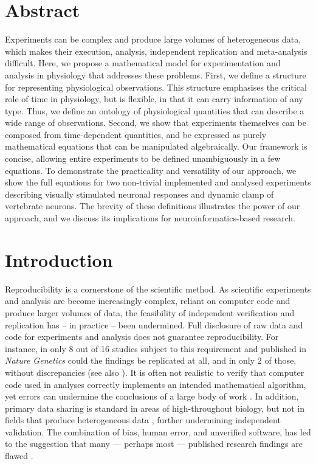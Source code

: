 
\section*{Abstract}

Experiments can be complex and produce large volumes of heterogeneous
data, which makes their execution, analysis, independent replication
and meta-analysis difficult. Here, we propose a mathematical model for
experimentation and analysis in physiology that addresses these
problems. First, we define a structure for representing physiological
observations. This structure emphasises the critical role of time in
physiology, but is flexible, in that it can carry information of any
type. Thus, we define an ontology of physiological quantities that can
describe a wide range of observations. Second, we show that
experiments themselves can be composed from time-dependent quantities,
and be expressed as purely mathematical equations that can be
manipulated algebraically. Our framework is concise, allowing entire
experiments to be defined unambiguously in a few equations. To
demonstrate the practicality and versatility of our approach, we show
the full equations for two non-trivial implemented and analysed
experiments describing visually stimulated neuronal responses and
dynamic clamp of vertebrate neurons. The brevity of these definitions
illustrates the power of our approach, and we discuss its implications
for neuroinformatics-based research.

\pagebreak

\section*{Introduction}

Reproducibility is a cornerstone of the scientific method. As
scientific experiments and analysis are become increasingly complex,
reliant on computer code and produce larger volumes of data, the
feasibility of independent verification and replication has -- in
practice -- been undermined. Full disclosure of raw data and code for
experiments and analysis does not guarantee reproducibility.  For
instance, in only 8 out of 16 studies subject to this requirement and
published in \emph{Nature Genetics} could the findings be replicated
at all, and in only 2 of those, without discrepancies
\cite{Ioannidis2008} (see also \cite{Baggerly2009,
  McCullough2007}). It is often not realistic to verify that computer
code used in analyses correctly implements an intended mathematical
algorithm, yet errors can undermine the conclusions of a
large body of work \cite{Chang2006}.  In addition, primary data
sharing is standard in areas of high-throughout biology, but
not in fields that produce heterogeneous data \cite{Gardner2005},
further undermining independent validation.  The combination
of bias, human error, and unverified software, has led to the
suggestion that many --- perhaps most --- published research findings
are flawed \cite{Ioannidis2005, Merali2010}.

